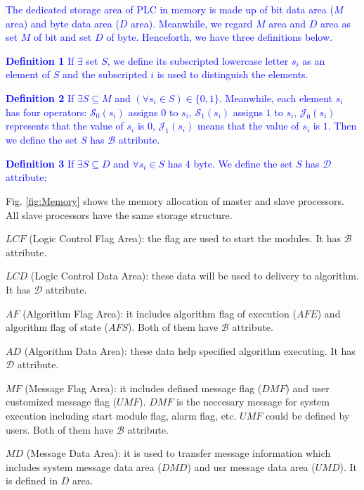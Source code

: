 \documentclass[journal,UTF8]{IEEEtran}
\begin{document}
\textcolor{blue}{The dedicated storage area of PLC in memory is made up of bit data area ($M$ area) and byte data area ($D$ area). Meanwhile, we regard $M$ area and $D$ area as set $M$ of bit and set $D$ of byte. Henceforth, we have three definitions below.}

\textcolor{blue}{\textbf{Definition 1} If $\exists$ set $S$, we define its subscripted lowercase letter $s_i$ as an element of $S$ and the subscripted $i$ is used to distinguish the elements.}

\textcolor{blue}{\textbf{Definition 2} If $\exists S \subseteq M$ and $(\forall s_{i} \in S) \in \{0, 1\} $. Meanwhile, each element $s_i$ has four operators: $\mathcal{S}_0(s_i)$ assigns $0$ to $s_i$, $\mathcal{S}_1(s_i)$ assigns $1$ to $s_i$, $\mathcal{J}_0(s_i)$ represents that the value of $s_i$ is $0$, $\mathcal{J}_1(s_i)$ means that the value of $s_i$ is $1$. Then we define the set $S$ has $\mathcal{B}$ attribute.}

\textcolor{blue}{\textbf{Definition 3} If $\exists S \subseteq D$ and $\forall s_{i} \in S$ has 4 byte. We define the set $S$ has $\mathcal{D}$ attribute:}





Fig. \ref{fig:Memory} shows the memory allocation of master and slave processors. All slave processors have the same storage structure.

\textbf{$LCF$} (Logic Control Flag Area): the flag are used to start the modules. It has $\mathcal{B}$ attribute.

\textbf{$LCD$} (Logic Control Data Area): these data will be used to delivery to algorithm. It has $\mathcal{D}$ attribute.

\textbf{$AF$} (Algorithm Flag Area): it includes algorithm flag of execution ($AFE$) and algorithm flag of state ($AFS$).
Both of them have $\mathcal{B}$ attribute.

\textbf{$AD$} (Algorithm Data Area): these data help specified algorithm executing. It has $\mathcal{D}$ attribute.

\textbf{$MF$} (Message Flag Area): it includes defined message flag ($DMF$) and user customized message flag ($UMF$). $DMF$ is the neccesary message for system execution including start module flag, alarm flag, etc. $UMF$ could be defined by users. Both of them have $\mathcal{B}$ attribute.

\textbf{$MD$} (Message Data Area): it is used to transfer message information which includes system message data area ($DMD$) and usr message data area ($UMD$). It is defined in $D$ area.
\end{document}
